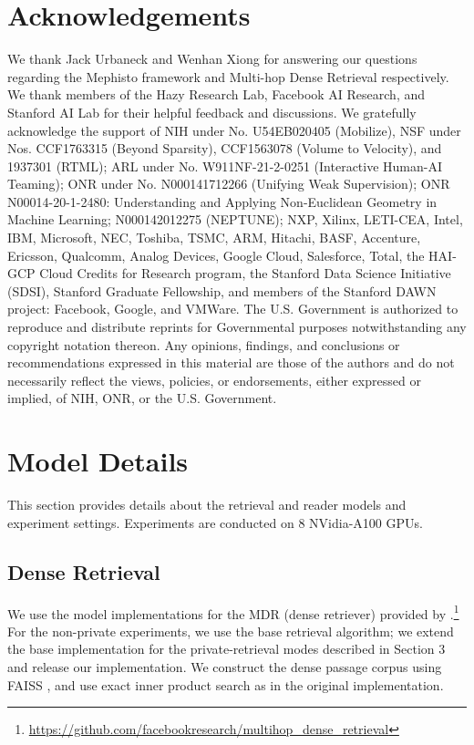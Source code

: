 \documentclass{article}
\renewcommand\cite{\citep}	\newcommand\shortcite{\citeyearpar}\newcommand\newcite{\citet}
\begin{document}
\section*{Acknowledgements}
We thank Jack Urbaneck and Wenhan Xiong for answering our questions regarding the Mephisto framework and Multi-hop Dense Retrieval respectively. We thank members of the Hazy Research Lab, Facebook AI Research, and Stanford AI Lab for their helpful feedback and discussions. We gratefully acknowledge the support of NIH under No. U54EB020405 (Mobilize), NSF under Nos. CCF1763315 (Beyond Sparsity), CCF1563078 (Volume to Velocity), and 1937301 (RTML); ARL under No. W911NF-21-2-0251 (Interactive Human-AI Teaming); ONR under No. N000141712266 (Unifying Weak Supervision); ONR N00014-20-1-2480: Understanding and Applying Non-Euclidean Geometry in Machine Learning; N000142012275 (NEPTUNE); NXP, Xilinx, LETI-CEA, Intel, IBM, Microsoft, NEC, Toshiba, TSMC, ARM, Hitachi, BASF, Accenture, Ericsson, Qualcomm, Analog Devices, Google Cloud, Salesforce, Total, the HAI-GCP Cloud Credits for Research program,  the Stanford Data Science Initiative (SDSI), Stanford Graduate Fellowship, and members of the Stanford DAWN project: Facebook, Google, and VMWare. The U.S. Government is authorized to reproduce and distribute reprints for Governmental purposes notwithstanding any copyright notation thereon. Any opinions, findings, and conclusions or recommendations expressed in this material are those of the authors and do not necessarily reflect the views, policies, or endorsements, either expressed or implied, of NIH, ONR, or the U.S. Government. 



  


\appendix
\label{sec:appendix}


\section{Model Details}
This section provides details about the retrieval and reader models and experiment settings. Experiments are conducted on 8 NVidia-A100 GPUs.

\subsection{Dense Retrieval} We use the model implementations for the MDR (dense retriever) provided by \citet{xiong2021mdr}.\footnote{\url{https://github.com/facebookresearch/multihop_dense_retrieval}} For the non-private experiments, we use the base retrieval algorithm; we extend the base implementation for the private-retrieval modes described in Section 3 and release our implementation. We construct the dense passage corpus using FAISS \cite{faiss2017}, and use exact inner product search as in the original implementation.  
\end{document}
